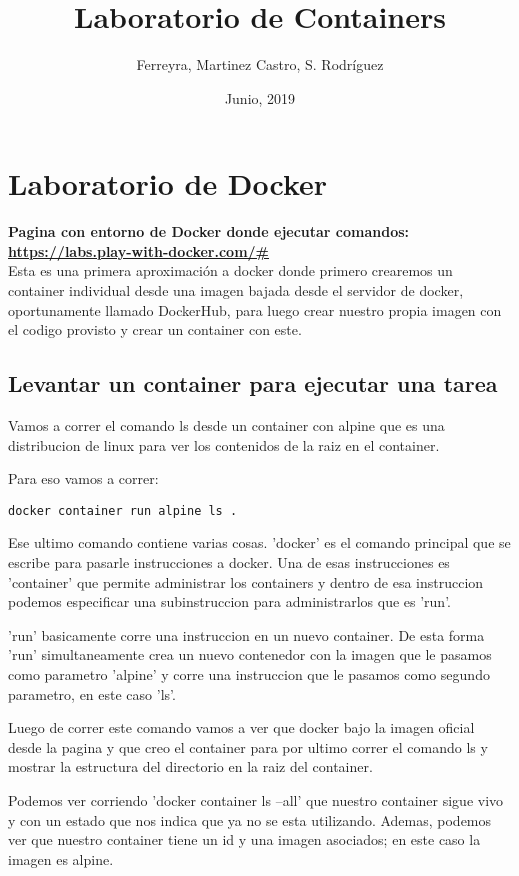 \documentclass[11pt]{article} %
\title{Laboratorio de Containers}
\author{Ferreyra, Martinez Castro, S. Rodríguez}
\date{Junio, 2019} %
\begin{document}
\maketitle

\section{Laboratorio de Docker}

\textbf{Pagina con entorno de Docker donde ejecutar comandos:\\\url{https://labs.play-with-docker.com/\#}} \\

Esta es una primera aproximación a docker donde primero crearemos un container individual desde una imagen bajada desde el servidor de docker, oportunamente llamado DockerHub, para luego crear nuestro propia imagen con el codigo provisto y crear un container con este.

\subsection{Levantar un container para ejecutar una tarea}

Vamos a correr el comando ls desde un container con alpine que es una distribucion de linux para ver los contenidos de la raiz en el container.

Para eso vamos a correr:
\begin{center}
\texttt{docker container run alpine ls .} \\
\end{center}

Ese ultimo comando contiene varias cosas. 'docker' es el comando principal que se escribe para pasarle instrucciones a docker. Una de esas instrucciones es 'container' que permite administrar los containers y dentro de esa instruccion podemos especificar una subinstruccion para administrarlos que es 'run'.

'run' basicamente corre una instruccion en un nuevo container. De esta forma 'run' simultaneamente crea un nuevo contenedor con la imagen que le pasamos como parametro 'alpine' y corre una instruccion que le pasamos como segundo parametro, en este caso 'ls'.


Luego de correr este comando vamos a ver que docker bajo la imagen oficial desde la pagina y que creo el container para por ultimo correr el comando ls y mostrar la estructura del directorio en la raiz del container.

Podemos ver corriendo 'docker container ls --all' que nuestro container sigue vivo y con un estado que nos indica que ya no se esta utilizando. Ademas, podemos ver que nuestro  container tiene un id y una imagen asociados; en este caso la imagen es alpine.
\end{document}
